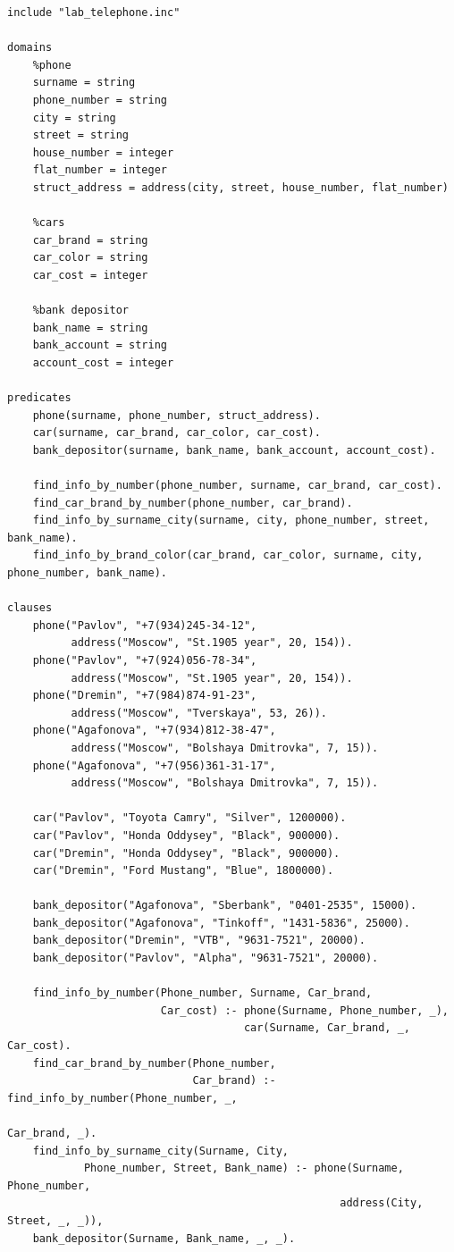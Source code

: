 \begin{lstlisting}[basicstyle=\footnotesize]
include "lab_telephone.inc"

domains
	%phone
	surname = string
	phone_number = string
	city = string
	street = string
	house_number = integer
	flat_number = integer
	struct_address = address(city, street, house_number, flat_number)
	
	%cars
	car_brand = string
	car_color = string
	car_cost = integer
	
	%bank depositor
	bank_name = string
	bank_account = string
	account_cost = integer

predicates
	phone(surname, phone_number, struct_address).
	car(surname, car_brand, car_color, car_cost).
	bank_depositor(surname, bank_name, bank_account, account_cost).
	
	find_info_by_number(phone_number, surname, car_brand, car_cost).
	find_car_brand_by_number(phone_number, car_brand).
	find_info_by_surname_city(surname, city, phone_number, street, bank_name).
	find_info_by_brand_color(car_brand, car_color, surname, city, phone_number, bank_name).

clauses
	phone("Pavlov", "+7(934)245-34-12", 
		  address("Moscow", "St.1905 year", 20, 154)).
	phone("Pavlov", "+7(924)056-78-34", 
		  address("Moscow", "St.1905 year", 20, 154)).
	phone("Dremin", "+7(984)874-91-23", 
		  address("Moscow", "Tverskaya", 53, 26)).
	phone("Agafonova", "+7(934)812-38-47",
	      address("Moscow", "Bolshaya Dmitrovka", 7, 15)).
	phone("Agafonova", "+7(956)361-31-17",
		  address("Moscow", "Bolshaya Dmitrovka", 7, 15)).
	
	car("Pavlov", "Toyota Camry", "Silver", 1200000).
	car("Pavlov", "Honda Oddysey", "Black", 900000).
	car("Dremin", "Honda Oddysey", "Black", 900000).
	car("Dremin", "Ford Mustang", "Blue", 1800000).
	
	bank_depositor("Agafonova", "Sberbank", "0401-2535", 15000).
	bank_depositor("Agafonova", "Tinkoff", "1431-5836", 25000).
	bank_depositor("Dremin", "VTB", "9631-7521", 20000).
	bank_depositor("Pavlov", "Alpha", "9631-7521", 20000).
	
	find_info_by_number(Phone_number, Surname, Car_brand, 
						Car_cost) :- phone(Surname, Phone_number, _),
									 car(Surname, Car_brand, _, Car_cost).
	find_car_brand_by_number(Phone_number, 
							 Car_brand) :- find_info_by_number(Phone_number, _, 
															  Car_brand, _).
	find_info_by_surname_city(Surname, City, 
			Phone_number, Street, Bank_name) :- phone(Surname, Phone_number, 
													address(City, Street, _, _)),
	bank_depositor(Surname, Bank_name, _, _).
	

\end{lstlisting}
